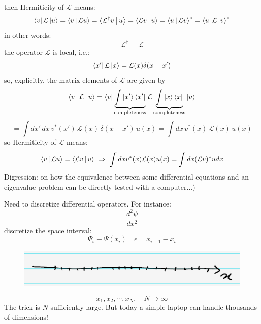 \documentclass{article}
\begin{document}
\noindent
then Hermiticity of $\mathcal{L}$ means:
\begin{equation}
    \bra{v} \mathcal{L} \ket{u} = \Braket{v|\mathcal{L}u} = \Braket{\mathcal{L}^{\dagger} v|u} = \Braket{\mathcal{L} v|u} = \Braket{u|\mathcal{L}v}^* = \bra{u} \mathcal{L} \ket{v}^*
\end{equation}
in other words:
\begin{equation}
    \mathcal{L}^\dagger = \mathcal{L}
\end{equation}
the operator $\mathcal{L}$ is local, i.e.:
\begin{equation}
    \bra{x'}\mathcal{L} \ket{x}  = \mathcal{L}(x) \delta{(x-x')}
\end{equation}
so, explicitly, the matrix elements of $\mathcal{L}$ are given by
\begin{equation}
    \Braket{v | \mathcal{L} | u}
= \bra{v} \underbrace{ \int \Ket{x'} \Bra{x'} }_{\text{completeness}} \mathcal{L} \underbrace{\int \Ket{x} \Bra{x} }_{\text{completeness}}  \ket{u}
\end{equation}
\begin{equation}
    = \int \! dx' \, dx \, v^*(x') \, \mathcal{L}(x) \, \delta(x - x') \, u(x)
= \int \! dx \, v^*(x) \, \mathcal{L}(x) \, u(x)
\end{equation}
so Hermiticity of $\mathcal{L}$ means:
\begin{equation}
    \Braket{v|\mathcal{L} u} = \Braket{\mathcal{L}v|u} \ \Rightarrow \ \int dxv^*(x) \mathcal{L}(x) u(x) = \int dx (\mathcal{L}v)^* udx
\end{equation}
Digression: on how the equivalence between some differential equations and an eigenvalue problem can be directly tested with a computer...)

\noindent
Need to discretize differential operators. For instance:
\begin{equation}
    \frac{d^2 \psi}{dx^2}
\end{equation}
discretize the space interval:
\begin{equation}
    \Psi_i \equiv \Psi (x_i) \quad \epsilon = x_{i+1}-x_i
\end{equation}
\begin{figure}[h]
    \centering
    \includegraphics[width=0.7\linewidth]{fig5.png}
\end{figure}
\begin{equation}
    x_1, x_2, \cdots , x_N, \quad N \rightarrow \infty
\end{equation}
The trick is $N$ sufficiently large. But today a simple laptop can handle thousands of dimensions!
\end{document}
